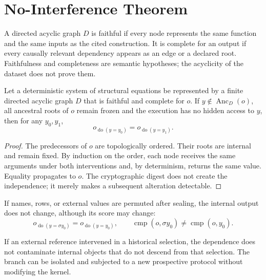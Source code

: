 \section{No-Interference Theorem}
\label{sec:teorema-no-interferencia}

\begin{definition}
\label{def:dag-fiel-completo}
A directed acyclic graph \(D\) is faithful if every node represents the same function and the same inputs as the cited construction. It is complete for an output if every causally relevant dependency appears as an edge or a declared root. Faithfulness and completeness are semantic hypotheses; the acyclicity of the dataset does not prove them.
\end{definition}

\begin{theorem}
\label{thm:no-interferencia-prospectiva}
Let a deterministic system of structural equations be represented by a
finite directed acyclic graph \(D\) that is faithful and complete for \(o\). If
\(y\notin\operatorname{Anc}_D(o)\), all ancestral roots of \(o\)
remain frozen and the execution has no hidden access to \(y\), then
for any \(y_0,y_1\),
\[
 o_{\operatorname{do}(y=y_0)}
 =o_{\operatorname{do}(y=y_1)}.
\]
\end{theorem}

\begin{proof}
The predecessors of \(o\) are topologically ordered. Their roots are internal
and remain fixed. By induction on the order, each node receives the same
arguments under both interventions and, by determinism, returns the same
value. Equality propagates to \(o\). The cryptographic digest does not create
the independence; it merely makes a subsequent alteration detectable.
\end{proof}

\begin{corollary}
\label{cor:permutacion-comparacion-externa}
If names, rows, or external values are permuted after sealing, the
internal output does not change, although its score may change:
\[
 o_{\operatorname{do}(y=\sigma y_0)}
 =o_{\operatorname{do}(y=y_0)},\qquad
 \operatorname{cmp}(o,\sigma y_0)
 \ne\operatorname{cmp}(o,y_0).
\]
\end{corollary}

\begin{proposition}
\label{prop:separacion-ramas-calibradas}
If an external reference intervened in a historical selection, the
dependence does not contaminate internal objects that do not descend from
that selection. The branch can be isolated and subjected to a new
prospective protocol without modifying the kernel.
\end{proposition}

